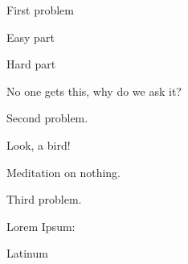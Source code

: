 \documentclass{nmd-exam}
\begin{document}
  \begin{problems}
    \item First problem
      \begin{subproblems}
      \item Easy part 

        \vspace{2cm}

        \hfill {}

      \item Hard part 

        \vspace{4cm}

        \hfill {}


      \item No one gets this, why do we ask it? 
        
        \vspace{1cm}
        
        \hfill \posnegzero
      \end{subproblems}

    \item Second problem.
      \begin{subproblems}
      \item Look, a bird!

        \vspace{1cm}

        \hfill \ansplane
        
      \item Meditation on nothing. 

        \vfill 

        \hfill \ansbox{\anspt}
      \end{subproblems}

      \pagebk


    \item Third problem.
      \begin{subproblems}
      \item Lorem Ipsum: \quad \truefalse

      \item Latinum 
        
        \vspace{4cm}

        \hfill {}


\end{subproblems}
\end{problems}
\end{document}
